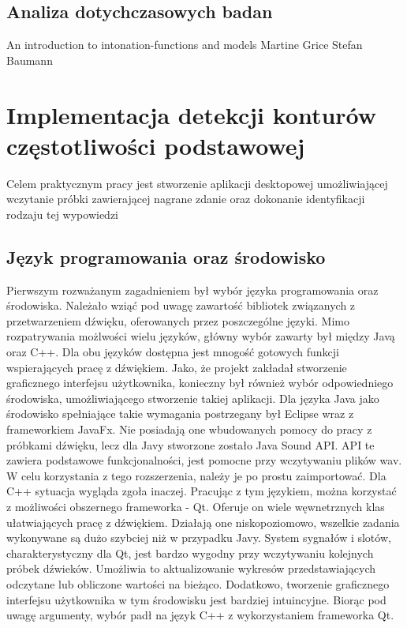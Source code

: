 \documentclass[a4paper,12 pt]{article}
\begin{document}
\subsection{Analiza dotychczasowych badan}
An introduction to intonation-functions and models Martine Grice Stefan Baumann 


\section{Implementacja detekcji konturów częstotliwości podstawowej}
Celem praktycznym pracy jest stworzenie aplikacji desktopowej umożliwiającej wczytanie próbki zawierającej nagrane zdanie oraz dokonanie identyfikacji rodzaju tej wypowiedzi

\subsection{Język programowania oraz środowisko}
Pierwszym rozważanym zagadnieniem był wybór języka programowania oraz środowiska. Należało wziąć pod uwagę zawartość bibliotek związanych z przetwarzeniem dźwięku, oferowanych przez poszczególne języki.
Mimo rozpatrywania możlwości wielu języków, główny wybór zawarty był między Javą oraz C++. Dla obu języków dostępna jest mnogość gotowych funkcji wspierających pracę z dźwiękiem. Jako, że projekt zakładał stworzenie graficznego interfejsu użytkownika, 
konieczny był również wybór odpowiedniego środowiska, umożliwiającego stworzenie takiej aplikacji. Dla języka Java jako środowisko spełniające takie wymagania postrzegany był Eclipse wraz z frameworkiem JavaFx. Nie posiadają one wbudowanych pomocy do pracy z próbkami dźwięku, lecz dla Javy stworzone zostało
Java Sound API. API te zawiera podstawowe funkcjonalności, jest pomocne przy wczytywaniu plików wav. W celu korzystania z tego rozszerzenia, należy je po prostu zaimportować. Dla  C++ sytuacja wygląda zgoła inaczej. Pracując z tym językiem, można korzystać z możliwości obszernego frameworka - Qt. Oferuje on wiele węwnetrznych klas ułatwiających pracę z dźwiękiem. Działają one niskopoziomowo, wszelkie zadania wykonywane są dużo szybciej niż w przypadku Javy.  System sygnałów i slotów, charakterystyczny dla Qt, jest bardzo wygodny przy wczytywaniu kolejnych próbek dźwieków. Umożliwia to aktualizowanie wykresów przedstawiających odczytane lub obliczone wartości na bieżąco. Dodatkowo, tworzenie graficznego interfejsu użytkownika w tym środowisku jest bardziej intuincyjne. Biorąc pod uwagę argumenty, wybór padł na język C++ z wykorzystaniem frameworka Qt.
\end{document}
